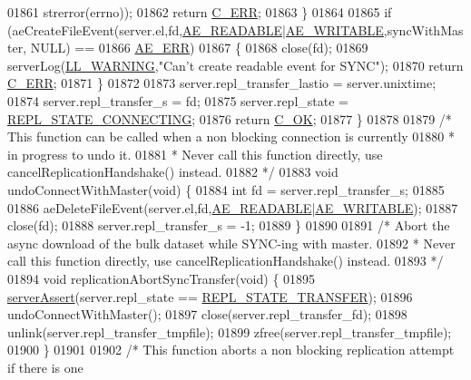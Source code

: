 \begin{DoxyCode}
{{{{{{{{{{{{{{{{{{{{{{{{{{{{{{{{{{{{{{{{{{{{{{{{{{{{{{{{{{{{{{{{{{{{{{{01861             strerror(errno));
01862         \textcolor{keywordflow}{return} \hyperlink{server_8h_af98ac28d5f4d23d7ed5985188e6fb7d1}{C\_ERR};
01863     \}
01864 
01865     \textcolor{keywordflow}{if} (aeCreateFileEvent(server.el,fd,\hyperlink{ae_8h_a7a9a2162d007d09739955b4e55c65bf3}{AE\_READABLE}|\hyperlink{ae_8h_ab6bfb0366ccb6277112d132c2a2bf500}{AE\_WRITABLE},syncWithMaster,
      NULL) ==
01866             \hyperlink{ae_8h_aa16dcf7effdf8f8df97f51b1cb51a9df}{AE\_ERR})
01867     \{
01868         close(fd);
01869         serverLog(\hyperlink{server_8h_a31229b9334bba7d6be2a72970967a14b}{LL\_WARNING},\textcolor{stringliteral}{"Can't create readable event for SYNC"});
01870         \textcolor{keywordflow}{return} \hyperlink{server_8h_af98ac28d5f4d23d7ed5985188e6fb7d1}{C\_ERR};
01871     \}
01872 
01873     server.repl\_transfer\_lastio = server.unixtime;
01874     server.repl\_transfer\_s = fd;
01875     server.repl\_state = \hyperlink{server_8h_a5fd7ad86a4a65d6486d151151a59e9a5}{REPL\_STATE\_CONNECTING};
01876     \textcolor{keywordflow}{return} \hyperlink{server_8h_a303769ef1065076e68731584e758d3e1}{C\_OK};
01877 \}
01878 
01879 \textcolor{comment}{/* This function can be called when a non blocking connection is currently}
01880 \textcolor{comment}{ * in progress to undo it.}
01881 \textcolor{comment}{ * Never call this function directly, use cancelReplicationHandshake() instead.}
01882 \textcolor{comment}{ */}
01883 \textcolor{keywordtype}{void} undoConnectWithMaster(\textcolor{keywordtype}{void}) \{
01884     \textcolor{keywordtype}{int} fd = server.repl\_transfer\_s;
01885 
01886     aeDeleteFileEvent(server.el,fd,\hyperlink{ae_8h_a7a9a2162d007d09739955b4e55c65bf3}{AE\_READABLE}|\hyperlink{ae_8h_ab6bfb0366ccb6277112d132c2a2bf500}{AE\_WRITABLE});
01887     close(fd);
01888     server.repl\_transfer\_s = -1;
01889 \}
01890 
01891 \textcolor{comment}{/* Abort the async download of the bulk dataset while SYNC-ing with master.}
01892 \textcolor{comment}{ * Never call this function directly, use cancelReplicationHandshake() instead.}
01893 \textcolor{comment}{ */}
01894 \textcolor{keywordtype}{void} replicationAbortSyncTransfer(\textcolor{keywordtype}{void}) \{
01895     \hyperlink{server_8h_a88114b5169b4c382df6b56506285e56a}{serverAssert}(server.repl\_state == \hyperlink{server_8h_a1d27594a2d9c8d24e4ed5a2e88d1113e}{REPL\_STATE\_TRANSFER});
01896     undoConnectWithMaster();
01897     close(server.repl\_transfer\_fd);
01898     unlink(server.repl\_transfer\_tmpfile);
01899     zfree(server.repl\_transfer\_tmpfile);
01900 \}
01901 
01902 \textcolor{comment}{/* This function aborts a non blocking replication attempt if there is one}
}}}}}}}}}}}}}}}}}}}}}}}}}}}}}}}}}}}}}}}}}}}}}}}}}}}}}}}}}}}}}}}}}}}}}}}
\end{DoxyCode}
